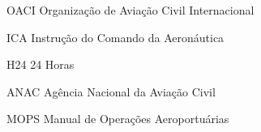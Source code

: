 \begin{siglas}
  \item[OACI] Organização de Aviação Civil Internacional
  \item[ICA] Instrução do Comando da Aeronáutica 
  \item[H24] 24 Horas
  \item[ANAC] Agência Nacional da Aviação Civil
  \item[MOPS] Manual de Operações Aeroportuárias
  
\end{siglas}